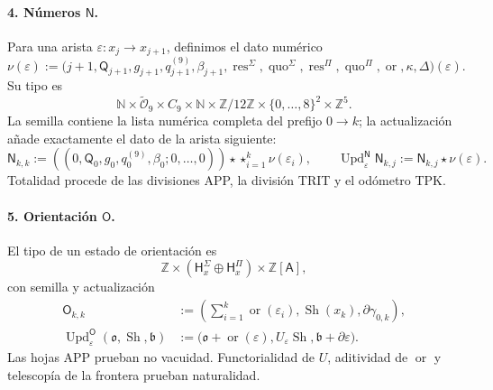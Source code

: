 \paragraph{4. Números \(\mathsf N\).}
Para una arista \(\varepsilon:x_j\to x_{j+1}\), definimos el dato numérico
\begin{equation}
\label{eq:pdfv2-terminal-numero-arista}
 \nu(\varepsilon):=
 \bigl(j+1,\mathsf Q_{j+1},g_{j+1},q^{(9)}_{j+1},\beta_{j+1},
 \operatorname{res}^{\Sigma},\operatorname{quo}^{\Sigma},
 \operatorname{res}^{\Pi},\operatorname{quo}^{\Pi},
 \operatorname{or},\kappa,\Delta\bigr)(\varepsilon).
\end{equation}
Su tipo es
\[
 \mathbb N\times\widetilde{\mathcal O}_9\times C_9\times\mathbb N
 \times\mathbb Z/12\mathbb Z
 \times\{0,\ldots,8\}^2\times\mathbb Z^5.
\]
La semilla contiene la lista numérica completa del prefijo \(0\to k\);
la actualización añade exactamente el dato de la arista siguiente:
\begin{equation}
\label{eq:pdfv2-terminal-update-n}
 \mathsf N_{k,k}:=
 ((0,\mathsf Q_0,g_0,q^{(9)}_0,\beta_0;0,\ldots,0))
 \star\mathop{\star}_{i=1}^{k}\nu(\varepsilon_i),\qquad
 \operatorname{Upd}^{\mathsf N}_{\varepsilon}\mathsf N_{k,j}
 :=\mathsf N_{k,j}\star\nu(\varepsilon).
\end{equation}
Totalidad procede de las divisiones APP, la división TRIT y el odómetro TPK.

\paragraph{5. Orientación \(\mathsf O\).}
El tipo de un estado de orientación es
\[
 \mathbb Z\times
 (\mathsf H^\Sigma_x\oplus\mathsf H^\Pi_x)
 \times\mathbb Z[\mathsf A],
\]
con semilla y actualización
\begin{align}
 \mathsf O_{k,k}&:=
 \left(\sum_{i=1}^{k}\operatorname{or}(\varepsilon_i),
       \operatorname{Sh}(x_k),\partial\gamma_{0,k}\right),
 \label{eq:pdfv2-terminal-semilla-o}\\
 \operatorname{Upd}^{\mathsf O}_{\varepsilon}
 (\mathfrak o,\operatorname{Sh},\mathfrak b)
 &:=
 \bigl(\mathfrak o+\operatorname{or}(\varepsilon),
 U_\varepsilon\operatorname{Sh},
 \mathfrak b+\partial\varepsilon\bigr).
 \label{eq:pdfv2-terminal-update-o}
\end{align}
Las hojas APP prueban no vacuidad. Functorialidad de \(U\), aditividad de
\(\operatorname{or}\) y telescopía de la frontera prueban naturalidad.

